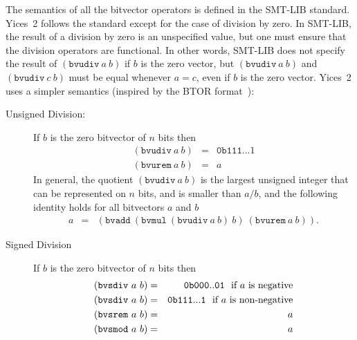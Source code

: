 \documentclass[11pt,twoside,fleqn,openright,titlepage]{cslreport}
\begin{document}
\medskip\noindent
The semantics of all the bitvector operators is defined in the
SMT-LIB standard.  Yices~2 follows the standard except for the
case of division by zero.  In SMT-LIB, the result of a division by
zero is an unspecified value, but one must ensure that the division
operators are functional. In other words, SMT-LIB does not specify the
result of $(\mathtt{bvudiv}\ a\ b)$ if $b$ is the zero vector, but
$(\mathtt{bvudiv}\ a\ b)$ and $(\mathtt{bvudiv}\ c\ b)$ must be equal
whenever $a = c$, even if $b$ is the zero vector. Yices~2 uses a
simpler semantics (inspired by the BTOR
format~\cite{Brummayer-etal:2008}):
\begin{description}
\item[Unsigned Division:]  If $b$ is  the zero bitvector  of $n$
  bits then
\begin{eqnarray*}
(\mathtt{bvudiv}\ a\ b) & = & \mathtt{0b111...1} \\
(\mathtt{bvurem}\ a\ b) & = & a
\end{eqnarray*}
In  general, the  quotient $(\mathtt{bvudiv}\  a\ b)$  is  the largest
unsigned integer that  can be represented on $n$  bits, and is smaller
than $a/b$,  and the following  identity holds for all  bitvectors $a$
and $b$
\begin{eqnarray*}
a & = & (\mathtt{bvadd}\ (\mathtt{bvmul}\ (\mathtt{bvudiv}\ a\ b)\ b)\ (\mathtt{bvurem}\ a\ b)).
\end{eqnarray*}

\item[Signed Division] If $b$ is the zero bitvector of $n$ bits then
\begin{eqnarray*}
(\mathtt{bvsdiv}\ a\ b) & = & \mathtt{0b000..01}~~\mbox{\rm if $a$ is negative} \\
(\mathtt{bvsdiv}\ a\ b) & = & \mathtt{0b111...1}~~\mbox{\rm if $a$ is non-negative} \\
(\mathtt{bvsrem}\ a\ b) & = & a \\
(\mathtt{bvsmod}\ a\ b) & = & a
\end{eqnarray*}
\end{description}
\end{document}
